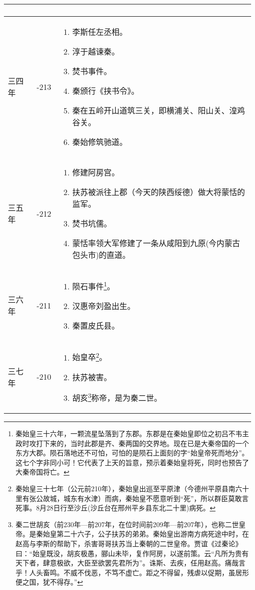 \begin{longtable}{|>{\centering\scriptsize}m{2em}|>{\centering\scriptsize}m{1.3em}|>{\centering}m{8.8em}|}
\begin{enumerate}
  \end{enumerate} \tabularnewline\hline
  三四年 & -213 & \begin{enumerate}
    \tiny
  \item 李斯任左丞相。
  \item 淳于越谏秦。
  \item 焚书事件。
  \item 秦颁行《挟书令》。
  \item 秦在五岭开山道筑三关，即横浦关、阳山关、湟鸡谷关。
  \item 秦始修筑驰道。
  \end{enumerate} \tabularnewline\hline
  三五年 & -212 & \begin{enumerate}
    \tiny
  \item 修建阿房宫。
  \item 扶苏被派往上郡（今天的陕西绥德）做大将蒙恬的监军。
  \item 焚书坑儒。
  \item 蒙恬率领大军修建了一条从咸阳到九原(今内蒙古包头市)的直道。
  \end{enumerate} \tabularnewline\hline
  三六年 & -211 & \begin{enumerate}
    \tiny
  \item 陨石事件\footnote{秦始皇三十六年，一颗流星坠落到了东郡。东郡是在秦始皇即位之初吕不韦主政时攻打下来的，当时此郡是齐、秦两国的交界地。现在已是大秦帝国的一个东方大郡。陨石落地还不可怕，可怕的是陨石上面刻的字“始皇帝死而地分”。这七个字非同小可！它代表了上天的旨意，预示着秦始皇将死，同时也预告了大秦帝国将亡。}。
  \item 汉惠帝刘盈出生。
  \item 秦置皮氏县。
  \end{enumerate} \tabularnewline\hline
  三七年 & -210 & \begin{enumerate}
    \tiny
  \item 始皇卒\footnote{秦始皇三十七年（公元前210年），秦始皇出巡至平原津（今德州平原县南六十里有张公故城，城东有水津）而病，秦始皇不愿意听到“死”，所以群臣莫敢言死事。8月28日行至沙丘(沙丘台在邢州平乡县东北二十里)病死。}。
  \item 扶苏被害。
  \item 胡亥\footnote{秦二世胡亥（前230年—前207年，在位时间前209年—前207年），也称二世皇帝。是秦始皇第二十六子，公子扶苏的弟弟。秦始皇出游南方病死途中时，在赵高与李斯的帮助下，杀害哥哥扶苏当上秦朝的二世皇帝。贾谊《过秦论》曰：“始皇既没，胡亥极愚，郦山未毕，复作阿房，以遂前策。云“凡所为贵有天下者，肆意极欲，大臣至欲罢先君所为”。诛斯、去疾，任用赵高。痛哉言乎！人头畜鸣。不威不伐恶，不笃不虚亡。距之不得留，残虐以促期，虽居形便之国，犹不得存。”}称帝，是为秦二世。
  \end{enumerate} \tabularnewline
  \bottomrule
\end{longtable}


